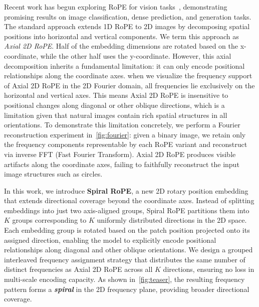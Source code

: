 Recent work has begun exploring RoPE for vision tasks~\cite{fangEVA02VisualRepresentation2024,luFiTFlexibleVision2024,luUnifiedIO2Scaling2023}, demonstrating promising results on image classification, dense prediction, and generation tasks. The standard approach extends 1D RoPE to 2D images by decomposing spatial positions into horizontal and vertical components. We term this approach as \textit{Axial 2D RoPE}. Half of the embedding dimensions are rotated based on the x-coordinate, while the other half uses the y-coordinate. However, this axial decomposition inherits a fundamental limitation: it can only encode positional relationships along the coordinate axes. when we visualize the frequency support of Axial 2D RoPE in the 2D Fourier domain, all frequencies lie exclusively on the horizontal and vertical axes. This means Axial 2D RoPE is insensitive to positional changes along diagonal or other oblique directions, which is a limitation given that natural images contain rich spatial structures in all orientations. To demonstrate this limitation concretely, we perform a Fourier reconstruction experiment in~\cref{fig:fourier}: given a binary image, we retain only the frequency components representable by each RoPE variant and reconstruct via inverse FFT (Fast Fourier Transform). Axial 2D RoPE produces visible artifacts along the coordinate axes, failing to faithfully reconstruct the input image structures such as circles.

In this work, we introduce \textbf{Spiral RoPE}, a new 2D rotary position embedding that extends directional coverage beyond the coordinate axes. Instead of splitting embeddings into just two axis-aligned groups, Spiral RoPE partitions them into $K$ groups corresponding to $K$ uniformly distributed directions in the 2D space. Each embedding group is rotated based on the patch position projected onto its assigned direction, enabling the model to explicitly encode positional relationships along diagonal and other oblique orientations. We design a grouped interleaved frequency assignment strategy that distributes the same number of distinct frequencies as Axial 2D RoPE across all $K$ directions, ensuring no loss in multi-scale encoding capacity. As shown in~\cref{fig:teaser}, the resulting frequency pattern forms a \textbf{\textit{spiral}} in the 2D frequency plane, providing broader directional coverage.

